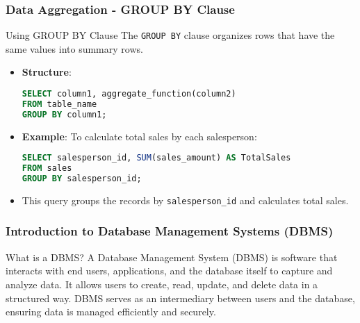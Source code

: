 \documentclass[aspectratio=169]{beamer}
\begin{document}
\begin{frame}[fragile]
    \frametitle{Data Aggregation - GROUP BY Clause}
    \begin{block}{Using GROUP BY Clause}
        The \texttt{GROUP BY} clause organizes rows that have the same values into summary rows.
    \end{block}
    
    \begin{itemize}
        \item \textbf{Structure}:
        \begin{lstlisting}[language=SQL]
SELECT column1, aggregate_function(column2) 
FROM table_name 
GROUP BY column1;
        \end{lstlisting}
        \item \textbf{Example}:
        To calculate total sales by each salesperson:
        \begin{lstlisting}[language=SQL]
SELECT salesperson_id, SUM(sales_amount) AS TotalSales 
FROM sales 
GROUP BY salesperson_id;
        \end{lstlisting}
        \item This query groups the records by \texttt{salesperson_id} and calculates total sales.
    \end{itemize}
\end{frame}

\begin{frame}[fragile]
    \frametitle{Introduction to Database Management Systems (DBMS)}
    \begin{block}{What is a DBMS?}
        A Database Management System (DBMS) is software that interacts with end users, applications, and the database itself to capture and analyze data. 
        It allows users to create, read, update, and delete data in a structured way. 
        DBMS serves as an intermediary between users and the database, ensuring data is managed efficiently and securely.
    \end{block}
\end{frame}
\end{document}
